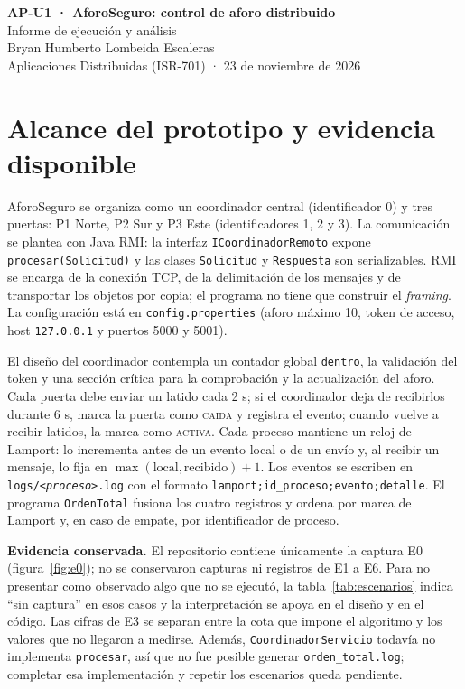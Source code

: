 \documentclass[10pt]{article}
\newcommand{\cod}[1]{\texttt{#1}}
\begin{document}
\begin{center}
  {\Large\bfseries AP-U1 · AforoSeguro: control de aforo distribuido}\\[3pt]
  {\large Informe de ejecución y análisis}\\[8pt]
  Bryan Humberto Lombeida Escaleras\\
  Aplicaciones Distribuidas (ISR-701) · 23 de noviembre de 2026
\end{center}

\section{Alcance del prototipo y evidencia disponible}

AforoSeguro se organiza como un coordinador central (identificador 0) y tres
puertas: P1 Norte, P2 Sur y P3 Este (identificadores 1, 2 y 3). La comunicación
se plantea con Java RMI: la interfaz \cod{ICoordinadorRemoto} expone
\cod{procesar(Solicitud)} y las clases \cod{Solicitud} y \cod{Respuesta} son
serializables. RMI se encarga de la conexión TCP, de la delimitación de los
mensajes y de transportar los objetos por copia; el programa no tiene que
construir el \emph{framing}. La configuración está en \cod{config.properties}
(aforo máximo 10, token de acceso, host \cod{127.0.0.1} y puertos 5000 y 5001).

El diseño del coordinador contempla un contador global \cod{dentro}, la
validación del token y una sección crítica para la comprobación y la
actualización del aforo. Cada puerta debe enviar un latido cada 2 s; si el
coordinador deja de recibirlos durante
6 s, marca la puerta como \textsc{caida} y registra el evento; cuando vuelve a
recibir latidos, la marca como \textsc{activa}. Cada proceso mantiene un reloj de
Lamport: lo incrementa antes de un evento local o de un envío y, al recibir un
mensaje, lo fija en $\max(\text{local},\text{recibido})+1$. Los eventos se
escriben en \cod{logs/<\emph{proceso}>.log} con el formato
\cod{lamport;id\_proceso;evento;detalle}. El programa \cod{OrdenTotal} fusiona
los cuatro registros y ordena por marca de Lamport y, en caso de empate, por
identificador de proceso.

\textbf{Evidencia conservada.} El repositorio contiene únicamente la captura
E0 (figura~\ref{fig:e0}); no se conservaron capturas ni registros de E1 a E6.
Para no presentar como observado algo que no se ejecutó, la tabla~\ref{tab:escenarios}
indica ``sin captura'' en esos casos y la interpretación se apoya en el diseño
y en el código. Las cifras de E3 se separan entre la cota que impone el
algoritmo y los valores que no llegaron a medirse. Además,
\cod{CoordinadorServicio} todavía no implementa \cod{procesar}, así que no fue
posible generar \cod{orden\_total.log}; completar esa implementación y repetir
los escenarios queda pendiente.
\end{document}
